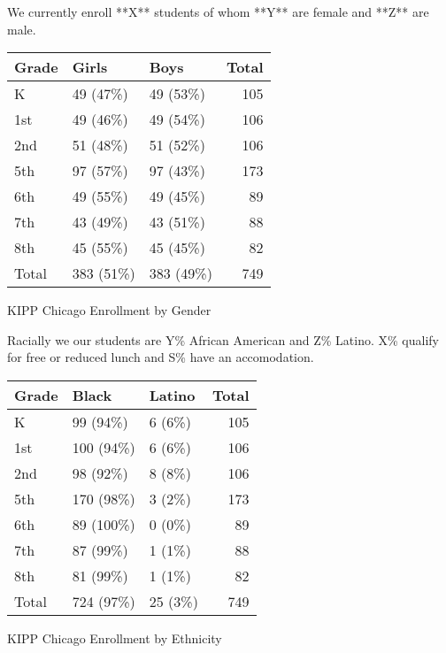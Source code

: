\documentclass[sfsidenotes, justified]{tufte-handout}\usepackage{graphicx, color}
\begin{document}
We currently enroll **X** students of whom **Y** are female and **Z** are male. 
\begin{margintable}

{\small
\begin{tabular}{lllr}
  \hline
Grade & Girls & Boys & Total \\ 
  \hline
K & 49 (47\%) & 49 (53\%) & 105 \\ 
  1st & 49 (46\%) & 49 (54\%) & 106 \\ 
  2nd & 51 (48\%) & 51 (52\%) & 106 \\ 
  5th & 97 (57\%) & 97 (43\%) & 173 \\ 
  6th & 49 (55\%) & 49 (45\%) &  89 \\ 
  7th & 43 (49\%) & 43 (51\%) &  88 \\ 
  8th & 45 (55\%) & 45 (45\%) &  82 \\ 
  Total & 383 (51\%) & 383 (49\%) & 749 \\ 
   \hline
\end{tabular}
}



\caption{KIPP Chicago Enrollment by Gender}
\end{margintable}
  
Racially we our students are Y\% African American and Z\% Latino.  X\% qualify for free or reduced lunch and S\% have an accomodation.

\begin{margintable}[7\baselineskip]

{\small
\begin{tabular}{lllr}
  \hline
Grade & Black & Latino & Total \\ 
  \hline
K & 99 (94\%) & 6 (6\%) & 105 \\ 
  1st & 100 (94\%) & 6 (6\%) & 106 \\ 
  2nd & 98 (92\%) & 8 (8\%) & 106 \\ 
  5th & 170 (98\%) & 3 (2\%) & 173 \\ 
  6th & 89 (100\%) & 0 (0\%) &  89 \\ 
  7th & 87 (99\%) & 1 (1\%) &  88 \\ 
  8th & 81 (99\%) & 1 (1\%) &  82 \\ 
  Total & 724 (97\%) & 25 (3\%) & 749 \\ 
   \hline
\end{tabular}
}



\caption{KIPP Chicago Enrollment by Ethnicity}
\end{margintable}
\end{document}
